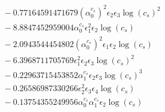 \documentclass[10pt]{article}
\begin{document}
\begin{align*}
&{}  - 0.77164591471679 \left(\alpha_{0}^{c_s}\right)^{2} \epsilon_{2} \epsilon_{3} \log{\left(c_{s} \right)}^{2} \\
&{}  - 8.8847452959004 \alpha_{0}^{c_s} \epsilon_{1}^{2} \epsilon_{2} \log{\left(c_{s} \right)} \\
&{}  - 2.0943544454802 \left(\alpha_{0}^{c_s}\right)^{2} \epsilon_{1} \epsilon_{2} \log{\left(c_{s} \right)} \\
&{}  - 6.3968711705769 \epsilon_{1}^{2} \epsilon_{2} \epsilon_{3} \log{\left(c_{s} \right)}^{2} \\
&{}  - 0.22963715453852 \alpha_{1}^{c_s} \epsilon_{2} \epsilon_{3} \log{\left(c_{s} \right)}^{3} \\
&{}  - 0.26586987330266 \epsilon_{2}^{2} \epsilon_{3} \epsilon_{4} \log{\left(c_{s} \right)} \\
&{}  - 0.13754355249956 \alpha_{0}^{c_s} \alpha_{1}^{c_s} \epsilon_{2} \log{\left(c_{s} \right)}
\end{align*}
\end{document}
